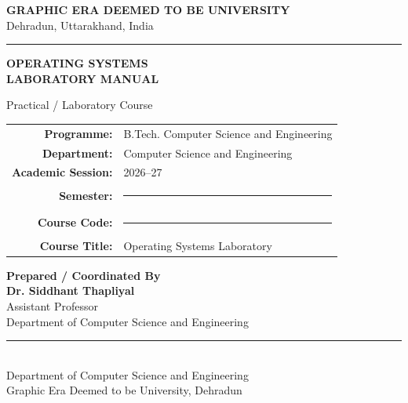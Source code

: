 \documentclass[12pt,a4paper]{report}
\begin{document}

\begin{titlepage}

\begin{center}

\vspace*{0.5cm}


{\Large\bfseries
GRAPHIC ERA DEEMED TO BE UNIVERSITY}\\[0.2cm]

{\large
Dehradun, Uttarakhand, India}\\[0.5cm]

\rule{\textwidth}{1.2pt}

\vspace{0.6cm}

{\Huge\bfseries\color{univblue}
OPERATING SYSTEMS\\
LABORATORY MANUAL}

\vspace{0.4cm}

{\Large
Practical / Laboratory Course}

\vspace{0.8cm}

\begin{tabular}{rl}
\textbf{Programme:} & B.Tech. Computer Science and Engineering \\[0.25cm]
\textbf{Department:} & Computer Science and Engineering \\[0.25cm]
\textbf{Academic Session:} & 2026--27 \\[0.25cm]
\textbf{Semester:} & \rule{4cm}{0.4pt} \\[0.25cm]
\textbf{Course Code:} & \rule{4cm}{0.4pt} \\[0.25cm]
\textbf{Course Title:} & Operating Systems Laboratory
\end{tabular}

\vfill

{\large\bfseries Prepared / Coordinated By}\\[0.25cm]

{\Large\bfseries Dr. Siddhant Thapliyal}\\
Assistant Professor\\
Department of Computer Science and Engineering

\vfill

\rule{0.8\textwidth}{0.6pt}\\
{\small Department of Computer Science and Engineering\\
Graphic Era Deemed to be University, Dehradun}

\end{center}

\end{titlepage}
\end{document}
